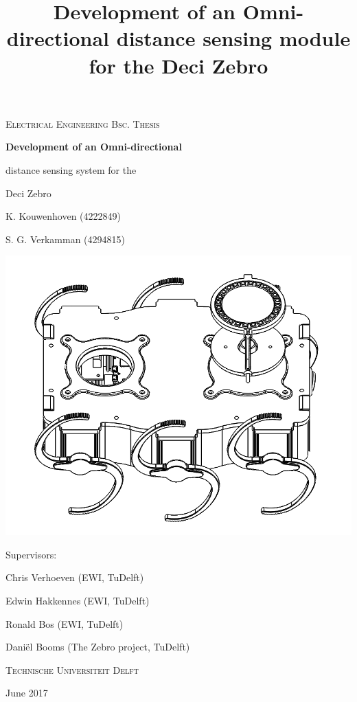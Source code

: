 \documentclass[
11pt, %
english, %
singlespacing, %
headsepline, %
]{MastersDoctoralThesis} %
\title{Development of an Omni-directional distance sensing module for the Deci Zebro}
\begin{document}
\frontmatter %

\pagestyle{plain} %



 \begin{titlepage}

	\vspace{1cm}
	{\scshape\Large Electrical Engineering Bsc. Thesis\par}
	\vspace{1cm}
	{\huge\bfseries Development of an Omni-directional\par distance sensing system for the\par Deci Zebro\par}
	\vspace{1.5cm}
	K. Kouwenhoven (4222849) \par S. G. Verkamman (4294815)\par
	\vspace{1.5cm}
  \includegraphics[width=\textwidth]{Figures/zebro_black_white.PNG}\par
	\vfill
	{\Large Supervisors:\par}
	Chris Verhoeven (EWI, TuDelft)\par
	Edwin Hakkennes (EWI, TuDelft)\par
	Ronald Bos (EWI, TuDelft)\par
	Daniël Booms (The Zebro project, TuDelft)\par
	\vspace{1cm}
	{\scshape\large Technische Universiteit Delft\par}
	{\large June 2017}
 \end{titlepage}
\end{document}
